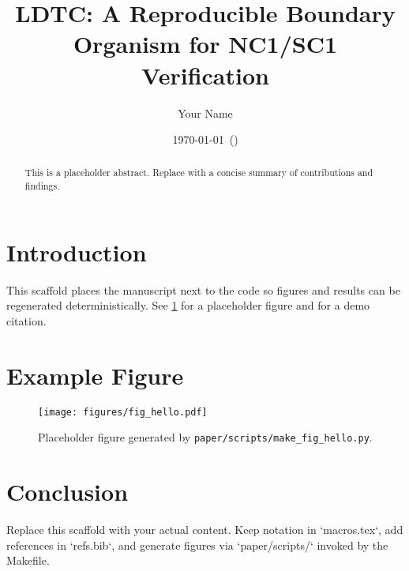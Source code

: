 \documentclass[11pt]{article}
\title{LDTC: A Reproducible Boundary Organism for NC1/SC1 Verification}
\author{Your Name}
\date{\today\ (\gitversion)}
\begin{document}
\maketitle

\begin{abstract}
This is a placeholder abstract. Replace with a concise summary of contributions and findings.
\end{abstract}

\section{Introduction}
This scaffold places the manuscript next to the code so figures and results can be regenerated deterministically. See \cref{fig:hello} for a placeholder figure and \citet{knuth1984texbook} for a demo citation.

\section{Example Figure}
\begin{figure}[t]
  \centering
  \texttt{[image: figures/fig\_hello.pdf]}
  \caption{Placeholder figure generated by \texttt{paper/scripts/make\_fig\_hello.py}.}
  \label{fig:hello}
\end{figure}

\section{Conclusion}
Replace this scaffold with your actual content. Keep notation in `macros.tex`, add references in `refs.bib`, and generate figures via `paper/scripts/` invoked by the Makefile.



\end{document}
